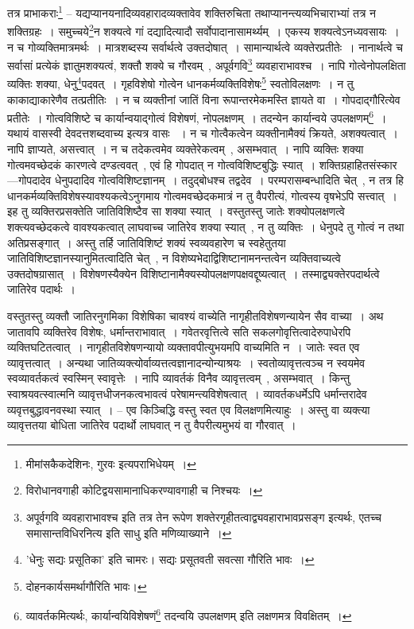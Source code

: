 			\begin{small}	

				तत्र प्राभाकराः\footnote{मीमांसकैकदेशिनः, गुरवः इत्यपराभिधेयम्~।} – यद्यप्यानयनादिव्यवहारादव्यक्तावेव शक्तिरुचिता तथाप्यानन्त्यव्यभिचाराभ्यां तत्र न शक्तिग्रहः~। समुच्चये\footnote{विरोधानवगाही कोटिद्वयसामानाधिकरण्यावगाही च निश्चयः~।}न शक्यत्वे गां दद्यादित्यादौ सर्वोपादानासामर्थ्यम्~। एकस्य शक्यत्वेऽनध्यवसायः~। न च गोव्यक्तिमात्रमर्थः~। मात्रशब्दस्य सर्वार्थत्वे उक्तदोषात्~। सामान्यार्थत्वे व्यक्तेरप्रतीतेः~। नानार्थत्वे च सर्वासां प्रत्येकं ज्ञातुमशक्यत्वं, शक्तौ शक्ये च गौरवम्~, अपूर्वगवि\footnote{अपूर्वगवि व्यवहाराभावश्च इति तत्र तेन रूपेण शक्तेरगृहीतत्वाद्व्यवहाराभावप्रसङ्ग इत्यर्थः, एतच्च समासान्तविधिरनित्य इति साधु इति मणिव्याख्याने~।} व्यवहाराभावश्च~। नापि गोत्वेनोपलक्षिता व्यक्तिः शक्या, धेनु\footnote{’धेनुः सद्यः प्रसूतिका’ इति चामरः। सद्यः प्रसूतवती सवत्सा गौरिति भावः~।}पदवत्~। गृहविशेषो गोत्वेन धानकर्मव्यक्तिविशेषः\footnote{दोहनकार्यसमर्थागौरिति भावः।} स्वतोविलक्षणः~। न तु काकाद्याकारेणैव तत्प्रतीतिः~। न च व्यक्तीनां जातिं विना रूपान्तरमेकमस्ति ज्ञायते वा~। गोपदाद्गौरित्येव प्रतीतेः~। गोत्वविशिष्टे च कार्यान्वयाद्गोत्वं विशेषणं, नोपलक्षणम्~। तदन्येन कार्यान्वये उपलक्षणम्\footnote{व्यावर्तकमित्यर्थः, कार्यान्वयिविशेषणं\footnote{विद्यमानं सत् व्यावर्तकम् , साक्षात्कार्यान्वयि इति यावत्~।} तदन्वयि उपलक्षणम् इति लक्षणमत्र विवक्षितम्~।}~। यथायं वासस्वी देवदत्तशब्दवाच्य इत्यत्र वासः ~। न च गोत्वैकत्वेन व्यक्तीनामैक्यं क्रियते, अशक्यत्वात्~। नापि ज्ञाप्यते, असत्त्वात्~। न च तदेकत्वमेव व्यक्तेरेकत्वम्~, असम्भवात्~। नापि व्यक्तिः शक्या गोत्वमवच्छेदकं कारणत्वे दण्डत्ववत्~, एवं हि गोपदात् न गोत्वविशिष्टबुद्धिः स्यात्~। शक्तिग्रहाहितसंस्कार---गोपदादेव धेनुपदादिव गोत्वविशिष्टज्ञानम्~। तदुद्बोधश्च तद्वदेव~। परम्परासम्बन्धादिति चेत्~, न तत्र हि धानकर्मव्यक्तिविशेषस्यावश्यकत्वेऽनुगमाय गोत्वमवच्छेदकमात्रं न तु वैपरीत्यं, गोत्वस्य वृषभेऽपि सत्त्वात्~। इह तु व्यक्तिरप्रसक्तेति जातिविशिष्टैव सा शक्या स्यात्~। वस्तुतस्तु जातेः शक्योपलक्षणत्वे शक्त्यवच्छेदकत्वे वावश्यकत्वात् लाघवाच्च जातिरेव शक्या स्यात्~, न तु व्यक्तिः~। धेनुपदे तु गोत्वं न तथा अतिप्रसङ्गात्~। अस्तु तर्हि जातिविशिष्टं शक्यं स्वव्यवहारेण च स्वहेतुतया जातिविशिष्टज्ञानस्यानुमितत्वादिति चेत्~, न विशेष्यभेदाद्विशिष्टानामनन्तत्वेन व्यक्तिवाच्यत्वे उक्तदोषग्रासात्~। विशेषणस्यैक्येन विशिष्टानामैक्यस्योपलक्षणपक्षवद्दूष्यत्वात्~। तस्माद्व्यक्तेरपदार्थत्वे जातिरेव पदार्थः~।

				वस्तुतस्तु व्यक्तौ जातिरनुगमिका विशेषिका चावश्यं वाच्येति नागृहीतविशेषणन्यायेन सैव वाच्या~। अथ जातावपि व्यक्तिरेव विशेषः, धर्मान्तराभावात्~। गवेतरवृत्तित्वे सति सकलगोवृत्तित्वादेरुपाधेरपि व्यक्तिघटितत्वात्~। नागृहीतविशेषणन्यायो व्यक्तावपीत्युभयमपि वाच्यमिति न~। जातेः स्वत एव व्यावृत्तत्वात्~। अन्यथा जातिव्यक्त्योर्वाव्यत्तत्वज्ञानादन्योन्याश्रयः~। स्वतोव्यावृत्तत्वञ्च न स्वयमेव स्वव्यावर्तकत्वं स्वस्मिन् स्वावृत्तेः~। नापि व्यावर्तकं विनैव व्यावृत्तत्वम्~, असम्भवात्~। किन्तु स्वाश्रयवत्स्वात्मनि व्यावृत्तधीजनकत्वभावत्वं परेषामन्त्यविशेषत्वात्~। व्यावर्तकधर्मेऽपि धर्मान्तरादेव व्यवृत्तबुद्धावनवस्था स्यात्~। -- एव किञ्चिद्धि वस्तु स्वत एव विलक्षणमित्याहुः~। अस्तु वा व्यक्त्या व्यावृत्ततया बोधिता जातिरेव पदार्थो लाघवात् न तु वैपरीत्यमुभयं वा गौरवात्~। 
			\end{small}

